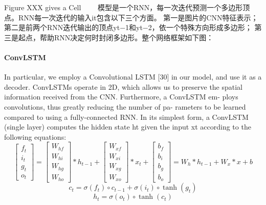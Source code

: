 Figure XXX gives a Cell
　　模型是一个RNN，每一次迭代预测一个多边形顶点。RNN每一次迭代的输入it包含以下三个方面。
第一是图片的CNN特征表示；
第二是前两个RNN迭代输出的顶点yt−1和yt−2，依一个特殊方向形成多边形；
第三是起点，帮助RNN决定何时封闭多边形。整个网络框架如下图：





\paragraph{ConvLSTM}
In particular, we employ a Convolutional LSTM [30] in
our model, and use it as a decoder. ConvLSTMs operate in 2D, which allows us to preserve the spatial information received from the CNN. Furthermore, a ConvLSTM em- ploys convolutions, thus greatly reducing the number of pa- rameters to be learned compared to using a fully-connected RNN. In its simplest form, a ConvLSTM (single layer) computes the hidden state ht given the input xt according to the following equations:
\begin{equation}
	\left[\begin{array}{c}
		f_t\\i_t\\g_t\\o_t
	\end{array}\right] = \left[\begin{array}{c}
		W_{hf}\\W_{hi}\\W_{hg}\\W_{ho}
	\end{array}\right] * h_{t-1} + \left[\begin{array}{c}
		W_{xf}\\W_{xi}\\W_{xg}\\W_{xo}
	\end{array}\right] * x_{t} + \left[\begin{array}{c}
		b_f\\b_i\\b_g\\b_o
	\end{array}\right] = W_h * h_{t-1} + W_x * x + b
\end{equation}
\begin{equation}
	c_t = \sigma(f_t) \circ c_{t-1} + \sigma(i_t) \circ \tanh(g_t)
\end{equation}
\begin{equation}
	h_t = \sigma(o_t) \circ \tanh(c_t)
\end{equation}

